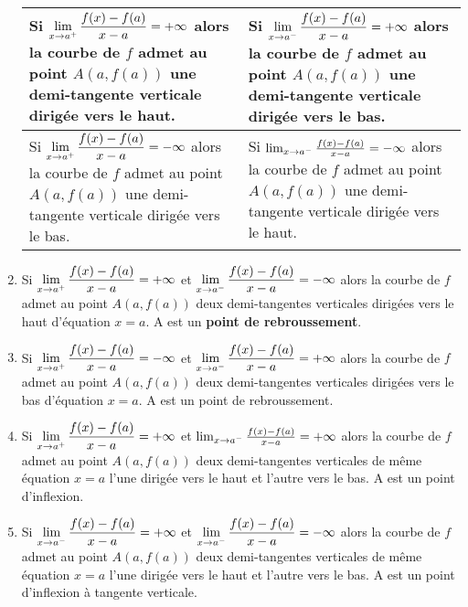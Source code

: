 \begin{example}
\begin{enumerate}
\medskip
\begin{tabularx}{\textwidth}{|X|X|}
\hline 
Si $ \displaystyle\lim_{x \to a^{+}} \frac{f(x)-f(a)}{x-a}=+\infty $ alors
la courbe de $f$ admet au point
$A (a, f (a))$ une demi-tangente
verticale dirigée vers le haut.
 & Si $\displaystyle \lim_{x \to a^{-}} \frac{f(x)-f(a)}{x-a}=+\infty $ alors 
la courbe de $f$ admet au point
$A (a, f (a))$ une demi-tangente
verticale dirigée vers le bas.  \\
\hline
Si $ \displaystyle\lim_{x \to a^{+}} \frac{f(x)-f(a)}{x-a}=-\infty $ alors
la courbe de $f$ admet au point
$A (a, f (a))$ une demi-tangente
verticale dirigée vers le bas. 
& Si  $ \lim_{x \to a^{-}} \frac{f(x)-f(a)}{x-a}=-\infty $ alors
la courbe de $f$ admet au point
$A (a, f (a))$ une demi-tangente
verticale dirigée vers le haut. \\
 \hline
\end{tabularx}
\item Si $\displaystyle \lim_{x \to a^{+}} \frac{f(x)-f(a)}{x-a}=+\infty $   et $ \displaystyle\lim_{x \to a^{-}} \frac{f(x)-f(a)}{x-a}=-\infty $ alors la courbe de $ f $ admet  au  point $ A (a, f (a)) $ deux demi-tangentes verticales  dirigées vers le haut  d'équation $ x=a $.  A est un \textbf{point de rebroussement}.
\item Si $\displaystyle \lim_{x \to a^{+}} \frac{f(x)-f(a)}{x-a}=-\infty $   et $\displaystyle \lim_{x \to a^{-}} \frac{f(x)-f(a)}{x-a}=+\infty $ alors la courbe de $ f $ admet  au  point $ A (a, f (a)) $ deux demi-tangentes verticales  dirigées vers le bas  d'équation $ x=a $.  A est un point de rebroussement.
\item Si $ \displaystyle\lim_{x \to a^{+}} \frac{f(x)-f(a)}{x-a}=+\infty $   et $ \lim_{x \to a^{-}} \frac{f(x)-f(a)}{x-a}=+\infty $ alors la courbe de $ f $ admet  au  point $ A (a, f (a)) $ deux demi-tangentes verticales de même équation $ x=a $ l'une dirigée vers le haut et l'autre vers le bas.  A est un point d'inflexion.
\item Si $ \displaystyle \lim_{x \to a^{-}} \frac{f(x)-f(a)}{x-a}=+\infty $   et $ \displaystyle \lim_{x \to a^{-}} \frac{f(x)-f(a)}{x-a}=-\infty $ alors la courbe de $ f $ admet  au  point $ A (a, f (a)) $ deux demi-tangentes verticales de même équation $ x=a $ l'une dirigée vers le haut et l'autre vers le bas.  A est un point d'inflexion à tangente verticale.
\end{enumerate}

\end{example}
